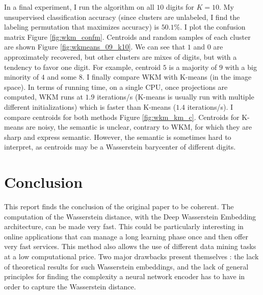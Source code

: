 \documentclass{article}
\begin{document}
In a final experiment, I run the algorithm on all $10$ digits for $K=10$. My unsupervised classification accuracy (since clusters are unlabeled, I find the labeling permutation that maximizes accuracy) is $50.1\%$. I plot the confusion matrix Figure \ref{fig:wkm_confm}. Centroids and random samples of each cluster are shown Figure \ref{fig:wkmeans_09_k10}. We can see that $1$ and $0$ are approximately recovered, but other clusters are mixes of digits, but with a tendency to favor one digit. For example, centroid $5$ is a majority of $9$ with a big minority of $4$ and some $8$. I finally compare WKM with K-means (in the image space). In terms of running time, on a single CPU, once projections are computed, WKM runs at $1.9$ iterations/s (K-means is usually run with multiple different initializations) which is faster than K-means ($1.4$ iterations/s). I compare centroids for both methods Figure \ref{fig:wkm_km_c}. Centroids for K-means are noisy, the semantic is unclear, contrary to WKM, for which they are sharp and express semantic. However, the semantic is sometimes hard to interpret, as centroids may be a Wasserstein barycenter of different digits.

\section{Conclusion}

This report finds the conclusion of the original paper to be coherent. The computation of the Wasserstein distance, with the Deep Wasserstein Embedding architecture, can be made very fast. This could be particularly interesting in online applications that can manage a long learning phase once and then offer very fast services. This method also allows the use of different data mining tasks at a low computational price. Two major drawbacks present themselves : the lack of theoretical results for such Wasserstein embeddings, and the lack of general principles for finding the complexity a neural network encoder has to have in order to capture the Wasserstein distance.

\newpage

\small



\end{document}
